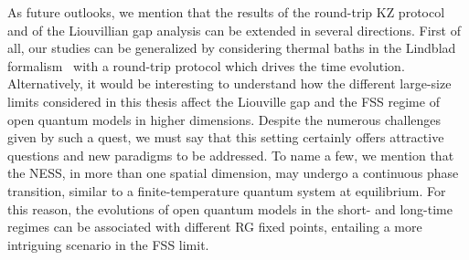 
As future outlooks, we mention that the results of the round-trip KZ protocol and of the Liouvillian gap analysis can be extended in several directions. First of all, our studies can be generalized by considering thermal baths in the Lindblad formalism~\cite{tarantelli2023thermal} with a round-trip protocol which drives the time evolution. Alternatively, it would be interesting to understand how the different large-size limits considered in this thesis affect the Liouville gap and the FSS regime of open quantum models in higher dimensions. Despite the numerous challenges given by such a quest, we must say that this setting certainly offers attractive questions and new paradigms to be addressed. To name a few, we mention that the NESS, in more than one spatial dimension, may undergo a continuous phase transition, similar to a finite-temperature quantum system at equilibrium. For this reason, the evolutions of open quantum models in the short- and long-time regimes can be associated with different RG fixed points, entailing a more intriguing scenario in the FSS limit.


